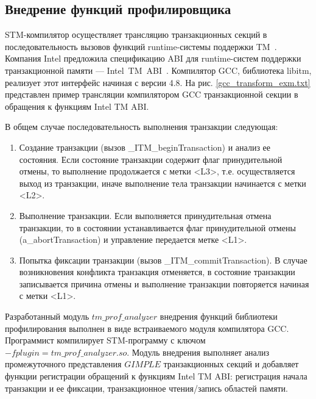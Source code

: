 
\subsection{Внедрение функций профилировщика}
STM-компилятор осуществляет трансляцию транзакционных секций в 
последовательность вызовов функций runtime-системы поддержки 
TM~\cite{olszewski_cutler_judostm}. Компания Intel предложила спецификацию ABI 
для runtime-систем поддержки транзакционной памяти --- 
Intel~TM~ABI~\cite{intel_tm_abi}. Компилятор GCC, библиотека libitm, реализует 
этот интерфейс начиная с версии 4.8. На рис. \ref{gcc_transform_exm.txt} 
представлен пример трансляции компилятором GCC транзакционной секции в обращения 
к функциям Intel TM ABI.


В общем случае последовательность выполнения транзакции следующая: 
\begin{enumerate}
\item Создание транзакции (вызов \_ITM\_beginTransaction) и анализ ее состояния. 
Если состояние транзакции содержит флаг принудительной отмены, то выполнение 
продолжается с метки <L3>, т.е. осуществляется выход из транзакции, иначе 
выполнение тела транзакции начинается с метки <L2>.
\item  Выполнение транзакции. Если выполняется принудительная отмена транзакции, 
то в состоянии устанавливается флаг принудительной отмены (a\_abortTransaction) 
и управление передается метке <L1>.
\item Попытка фиксации транзакции (вызов \_ITM\_commitTransaction). В случае 
возникновения конфликта транзакция отменяется, в состояние транзакции 
записывается причина отмены и выполнение транзакции повторяется начиная с метки 
<L1>.
\end{enumerate}

Разработанный модуль $tm\_prof\_analyzer$ внедрения функций библиотеки 
профилирования выполнен в виде встраиваемого модуля компилятора GCC. Программист 
компилирует STM-программу с ключом $-fplugin=tm\_prof\_analyzer.so$. Модуль 
внедрения выполняет анализ промежуточного представления $GIMPLE$ транзакционных 
секций и добавляет функции регистрации обращений к функциям Intel TM ABI: 
регистрация начала транзакции и ее фиксации, транзакционное чтения/запись 
областей памяти.

